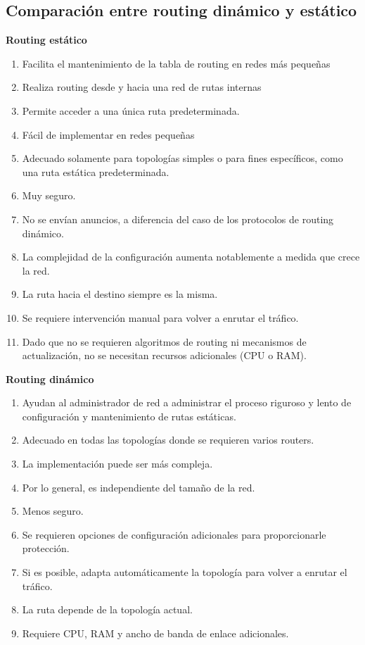 \documentclass[
	12pt, %
	fleqn, %
	a4paper, %
	oneside, %
]{LegrandOrangeBook}
\begin{document}
\subsection{Comparación entre routing dinámico y estático}
\textbf{Routing estático}
\begin{enumerate}
\item Facilita el mantenimiento de la tabla de routing en redes más pequeñas
\item Realiza routing desde y hacia una red de rutas internas
\item Permite acceder a una única ruta predeterminada.
\item Fácil de implementar en redes pequeñas
\item Adecuado solamente para topologías simples o para fines específicos, como una ruta estática predeterminada.
\item Muy seguro.
\item No se envían anuncios, a diferencia del caso de los protocolos de routing dinámico.
\item La complejidad de la configuración aumenta notablemente a medida que crece la red.
\item La ruta hacia el destino siempre es la misma.
\item Se requiere intervención manual para volver a enrutar el tráfico.
\item Dado que no se requieren algoritmos de routing ni mecanismos de actualización, no se necesitan recursos adicionales (CPU o RAM). 
\end{enumerate}
\textbf{Routing dinámico}
\begin{enumerate}
\item Ayudan al administrador de red a administrar el proceso riguroso y lento de configuración y mantenimiento de rutas estáticas.
\item Adecuado en todas las topologías donde se requieren varios routers.
\item La implementación puede ser más compleja.
\item Por lo general, es independiente del tamaño de la red.
\item Menos seguro.
\item Se requieren opciones de configuración adicionales para proporcionarle protección.
\item Si es posible, adapta automáticamente la topología para volver a enrutar el tráfico.
\item La ruta depende de la topología actual.
\item Requiere CPU, RAM y ancho de banda de enlace adicionales.
\end{enumerate}
\end{document}
